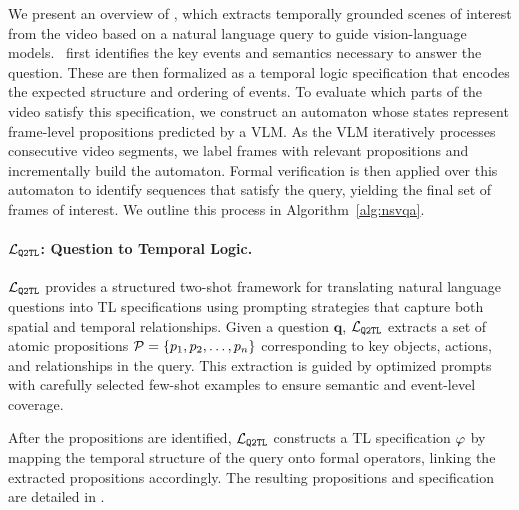 \documentclass[letterpaper]{article} %
\begin{document}
    We present an overview of \nsvqa, which extracts temporally grounded scenes of interest from the video based on a natural language query to guide vision-language models. \nsvqa\ first identifies the key events and semantics necessary to answer the question. These are then formalized as a temporal logic specification that encodes the expected structure and ordering of events. To evaluate which parts of the video satisfy this specification, we construct an automaton whose states represent frame-level propositions predicted by a VLM. As the VLM iteratively processes consecutive video segments, we label frames with relevant propositions and incrementally build the automaton. Formal verification is then applied over this automaton to identify sequences that satisfy the query, yielding the final set of frames of interest. We outline this process in Algorithm~\ref{alg:nsvqa}.
    
    \paragraph{$\mathcal{L}_\texttt{Q2TL}$: Question to Temporal Logic.}
    $\mathcal{L}_\texttt{Q2TL}$ provides a structured two-shot framework for translating natural language questions into TL specifications using prompting strategies that capture both spatial and temporal relationships. Given a question $\textbf{q}$, $\mathcal{L}_\texttt{Q2TL}$ extracts a set of atomic propositions $\mathcal{P} = \{p_1, p_2, \ldots, p_n\}$ corresponding to key objects, actions, and relationships in the query. This extraction is guided by optimized prompts with carefully selected few-shot examples to ensure semantic and event-level coverage.
    
    After the propositions are identified, $\mathcal{L}_\texttt{Q2TL}$ constructs a TL specification $\varphi$ by mapping the temporal structure of the query onto formal operators, linking the extracted propositions accordingly. The resulting propositions and specification are detailed in .

    \vspace{1ex}
\end{document}
